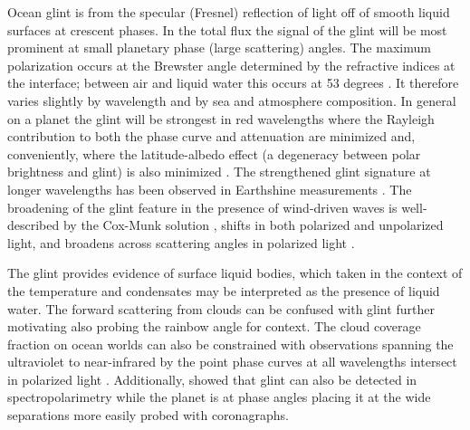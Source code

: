 \documentclass[
    usenatbib,
]{mnras}
\begin{document}
Ocean glint is from the specular (Fresnel) reflection of light off of smooth liquid surfaces at crescent phases.
%
In the total flux the signal of the glint will be most prominent at small planetary phase (large scattering) angles.
%
The maximum polarization occurs at the Brewster angle determined by the refractive indices at the interface; between air and liquid water this occurs at 53 degrees  \citep[a scattering angle of 127 degrees; see e.g. ][]{2008Icar..195..927W}.
%
It therefore varies slightly by wavelength and by sea and atmosphere composition.
%
In general on a planet the glint will be strongest in red wavelengths where the Rayleigh contribution to both the phase curve and attenuation are minimized \citep{Zugger_2011} and, conveniently, where the latitude-albedo effect (a degeneracy between polar brightness and glint) is also minimized \citep{2012ApJ...752L...3C}.
%
The strengthened glint signature at longer wavelengths has been observed in Earthshine measurements \citep{Emde2017,sterzik2019, takahashi2021}.
%
The broadening of the glint feature in the presence of wind-driven waves is well-described by the Cox-Munk solution \citep{CoxMunk1954}, shifts in both polarized and unpolarized light, and broadens across scattering angles in polarized light \citep{kopparla2018, Zugger_2010, treesandstam2019, trees2022}. 

The glint provides evidence of surface liquid bodies, which taken in the context of the temperature and condensates may be interpreted as the presence of liquid water.
%
The forward scattering from clouds can be confused with glint \citep{Robinson_2010} further motivating also probing the rainbow angle for context.
%
The cloud coverage fraction on ocean worlds can also be constrained with observations spanning the ultraviolet to near-infrared by the point phase curves at all wavelengths intersect in polarized light \citep{treesandstam2019}.
%
Additionally, \citet{trees2022} showed that glint can also be detected in spectropolarimetry while the planet is at phase angles placing it at the wide separations more easily probed with coronagraphs.


\end{document}
